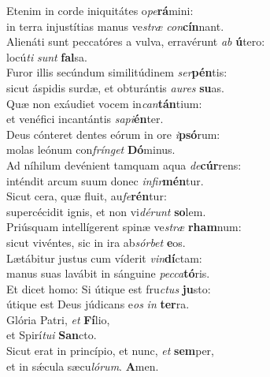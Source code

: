 \evenverse Etenim in corde iniquitátes o\textit{pe}\textbf{rá}mini:~\*\\
\evenverse in terra injustítias manus ve\textit{stræ} \textit{con}\textbf{cín}nant.\\
\oddverse Alienáti sunt peccatóres a vulva, erravérunt \textit{ab} \textbf{ú}tero:~\*\\
\oddverse locú\textit{ti} \textit{sunt} \textbf{fal}sa.\\
\evenverse Furor illis secúndum similitúdinem \textit{ser}\textbf{pén}tis:~\*\\
\evenverse sicut áspidis surdæ, et obturántis \textit{au}\textit{res} \textbf{su}as.\\
\oddverse Quæ non exáudiet vocem in\textit{can}\textbf{tán}tium:~\*\\
\oddverse et venéfici incantántis \textit{sa}\textit{pi}\textbf{én}ter.\\
\evenverse Deus cónteret dentes eórum in ore \textit{i}\textbf{psó}rum:~\*\\
\evenverse molas leónum con\textit{frín}\textit{get} \textbf{Dó}minus.\\
\oddverse Ad níhilum devénient tamquam aqua \textit{de}\textbf{cúr}rens:~\*\\
\oddverse inténdit arcum suum donec \textit{in}\textit{fir}\textbf{mén}tur.\\
\evenverse Sicut cera, quæ fluit, au\textit{fe}\textbf{rén}tur:~\*\\
\evenverse supercécidit ignis, et non vi\textit{dé}\textit{runt} \textbf{so}lem.\\
\oddverse Priúsquam intellígerent spinæ ve\textit{stræ} \textbf{rham}num:~\*\\
\oddverse sicut vivéntes, sic in ira ab\textit{sór}\textit{bet} \textbf{e}os.\\
\evenverse Lætábitur justus cum víderit \textit{vin}\textbf{dí}ctam:~\*\\
\evenverse manus suas lavábit in sánguine \textit{pec}\textit{ca}\textbf{tó}ris.\\
\oddverse Et dicet homo: Si útique est fru\textit{ctus} \textbf{ju}sto:~\*\\
\oddverse útique est Deus júdicans e\textit{os} \textit{in} \textbf{ter}ra.\\
\evenverse Glória Patri, \textit{et} \textbf{Fí}lio,~\*\\
\evenverse et Spirí\textit{tu}\textit{i} \textbf{San}cto.\\
\oddverse Sicut erat in princípio, et nunc, \textit{et} \textbf{sem}per,~\*\\
\oddverse et in sǽcula sæcu\textit{ló}\textit{rum}. \textbf{A}men.\\
